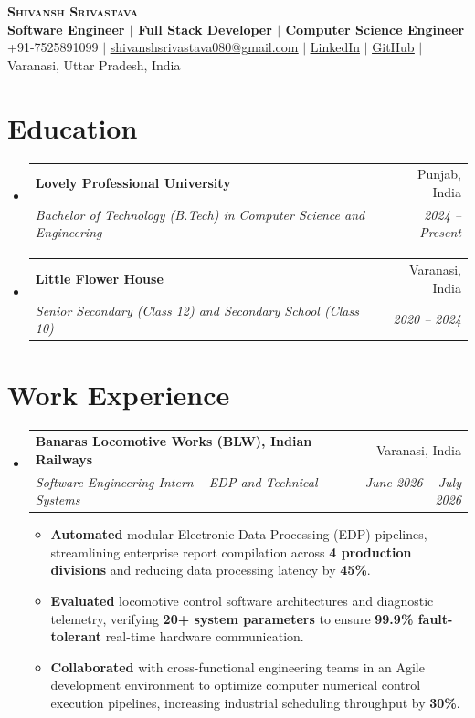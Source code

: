 \documentclass[letterpaper,10pt]{article}
\makeatletter
\newcommand{\resumeItem}[1]{
  \item\small{
    {#1 \vspace{-2pt}}
  }
}
\newcommand{\resumeSubheading}[4]{
  \vspace{-2pt}\item
    \begin{tabular*}{0.97\textwidth}[t]{l@{\extracolsep{\fill}}r}
      \textbf{#1} & #2 \\
      \textit{\small#3} & \textit{\small #4} \\
    \end{tabular*}\vspace{-7pt}
}
\newcommand{\resumeSubHeadingListStart}{\begin{itemize}[leftmargin=0.15in, label={}]}
\newcommand{\resumeSubHeadingListEnd}{\end{itemize}}
\newcommand{\resumeItemListStart}{\begin{itemize}}
\newcommand{\resumeItemListEnd}{\end{itemize}\vspace{-5pt}}
\makeatother
\begin{document}
\begin{center}
    \textbf{\Huge \scshape Shivansh Srivastava} \\ \vspace{1pt}
    \textbf{\small Software Engineer $|$ Full Stack Developer $|$ Computer Science Engineer} \\ \vspace{2pt}
    \small +91-7525891099 $|$ \href{mailto:shivanshsrivastava080@gmail.com}{\underline{shivanshsrivastava080@gmail.com}} $|$ 
    \href{https://www.linkedin.com/in/shivansh-srivastava-67b7892b9/}{\underline{LinkedIn}} $|$
    \href{https://github.com/shivansh01-24}{\underline{GitHub}} $|$
    \small Varanasi, Uttar Pradesh, India
\end{center}

\section{Education}
  \resumeSubHeadingListStart
    \resumeSubheading
      {Lovely Professional University}{Punjab, India}
      {Bachelor of Technology (B.Tech) in Computer Science and Engineering}{2024 -- Present}
    \resumeSubheading
      {Little Flower House}{Varanasi, India}
      {Senior Secondary (Class 12) and Secondary School (Class 10)}{2020 -- 2024}
  \resumeSubHeadingListEnd

\section{Work Experience}
  \resumeSubHeadingListStart
    \resumeSubheading
      {Banaras Locomotive Works (BLW), Indian Railways}{Varanasi, India}
      {Software Engineering Intern -- EDP and Technical Systems}{June 2026 -- July 2026}
      \resumeItemListStart
        \resumeItem{\textbf{Automated} modular Electronic Data Processing (EDP) pipelines, streamlining enterprise report compilation across \textbf{4 production divisions} and reducing data processing latency by \textbf{45\%}.}
        \resumeItem{\textbf{Evaluated} locomotive control software architectures and diagnostic telemetry, verifying \textbf{20+ system parameters} to ensure \textbf{99.9\% fault-tolerant} real-time hardware communication.}
        \resumeItem{\textbf{Collaborated} with cross-functional engineering teams in an Agile development environment to optimize computer numerical control execution pipelines, increasing industrial scheduling throughput by \textbf{30\%}.}
      \resumeItemListEnd
  \resumeSubHeadingListEnd
\end{document}
